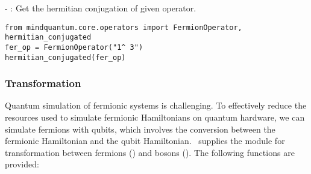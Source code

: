 -  : Get the hermitian conjugation of given operator.

\begin{lstlisting}
from mindquantum.core.operators import FermionOperator, hermitian_conjugated
fer_op = FermionOperator("1^ 3")
hermitian_conjugated(fer_op)
\end{lstlisting}

\subsubsection{Transformation}
Quantum simulation of fermionic systems is challenging. To effectively reduce the resources used to simulate fermionic Hamiltonians on quantum hardware, we can simulate fermions with qubits, which involves the conversion between the fermionic Hamiltonian and the qubit Hamiltonian. \MindQuantum\ supplies the module  for transformation between fermions (\FermionOperator) and bosons (\QubitOperator). The following functions are provided:
